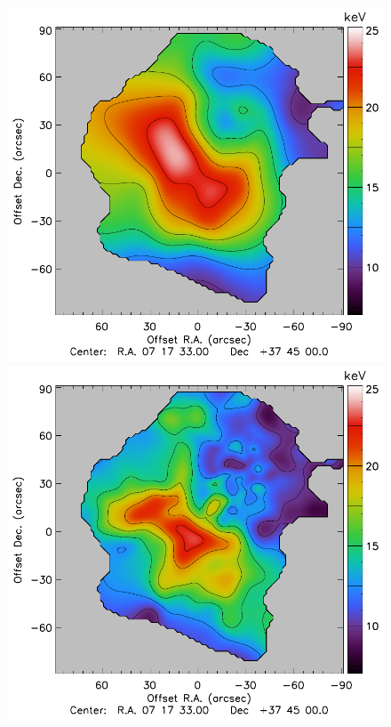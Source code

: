 \documentclass[twocolumn,traditabstract]{aa}
\begin{document}
\begin{figure}[h]
\centering
\includegraphics[trim=0cm 0cm 1.4cm 0cm, clip=true, totalheight=6.7cm]{Figure/Thermo_TCXO.pdf}
\includegraphics[trim=1.6cm 0cm 1.4cm 0cm, clip=true, totalheight=6.7cm]{Figure/Thermo_TXMM.pdf}

\end{figure}
\end{document}
